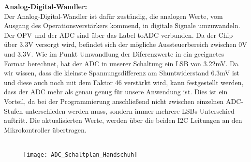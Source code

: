 \documentclass[11pt]{article}
\begin{document}
\textbf{Analog-Digital-Wandler:}
\\
Der Analog-Digital-Wandler ist dafür zuständig, die analogen Werte, vom Ausgang des Operationsverstärkers kommend, in digitale 
Signale umzuwandeln. Der OPV und der ADC sind über das Label toADC verbunden. Da der Chip über 3.3V versorgt wird, befindet
sich der mögliche Aussteuerbereich zwischen 0V und 3.3V. Wie im Punkt Umwandlung der Diferenzwerte in ein geeignetes Format berechnet, 
hat der ADC in unserer Schaltung ein LSB von 3.22mV. Da wir wissen, dass die kleinste Spannungsdifferenz am Shuntwiderstand 6.3mV
ist und diese auch noch mit dem Faktor 46 verstärkt wird, kann festgestellt werden, dass der ADC mehr als genau genug für unsere
Anwendung ist. Dies ist ein Vorteil, da bei der Programmierung anschließend nicht zwischen einzelnen ADC-Stufen unterschieden werden
muss, sondern immer mehrere LSBs Unterschied auftritt. Die aktualisierten Werte, werden über die beiden I2C Leitungen an den 
Mikrokontroller übertragen. \\
\\
\begin{figure}[H]
	\begin{center}
		\scalebox{0.5}
		{\texttt{[image: ADC\_Schaltplan\_Handschuh]}}
	\end{center}
\end{figure}
\end{document}
